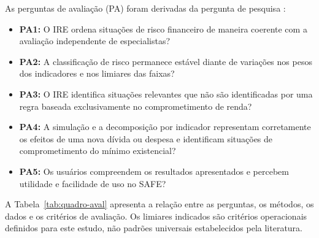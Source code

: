 \documentclass[portuguese]{sbc2025}%
\begin{document}
As perguntas de avaliação (PA) foram derivadas da pergunta de pesquisa
\citep{ref5}:

\begin{itemize}[leftmargin=*,itemsep=2pt]
    \item \textbf{PA1:} O IRE ordena situações de risco financeiro de
    maneira coerente com a avaliação independente de especialistas?

    \item \textbf{PA2:} A classificação de risco permanece estável diante
    de variações nos pesos dos indicadores e nos limiares das faixas?

    \item \textbf{PA3:} O IRE identifica situações relevantes que não são
    identificadas por uma regra baseada exclusivamente no comprometimento
    de renda?

    \item \textbf{PA4:} A simulação e a decomposição por indicador
    representam corretamente os efeitos de uma nova dívida ou despesa
    e identificam situações de comprometimento do mínimo existencial?

    \item \textbf{PA5:} Os usuários compreendem os resultados apresentados
    e percebem utilidade e facilidade de uso no SAFE?
\end{itemize}

A Tabela~\ref{tab:quadro-aval} apresenta a relação entre as perguntas,
os métodos, os dados e os critérios de avaliação. Os limiares indicados
são critérios operacionais definidos para este estudo, não padrões
universais estabelecidos pela literatura.
\end{document}
